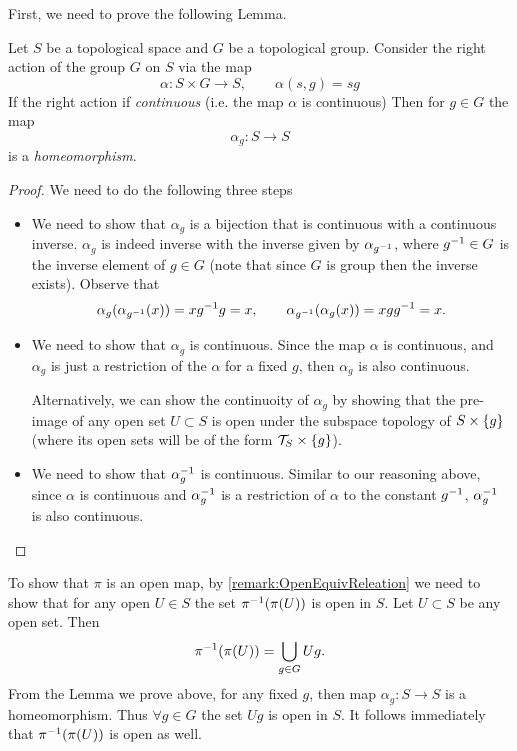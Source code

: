 \begin{solution}
	First, we need to prove the following Lemma.
	\begin{lemma}
		Let $ S $ be a topological space and $ G $ be a topological group. Consider the right action of the group $ G $ on $ S $ via the map 
		\[ \alpha : S \times G \to S, \qquad \alpha(s,g) = sg \]
		If the right action if \emph{continuous} (i.e. the map $ \alpha $ is continuous) Then for $ g \in G $ the map
		\[ \alpha_g: S \to S \]
		is a \emph{homeomorphism}.
	\end{lemma}
	\begin{proof}
		We need to do the following three steps
		\begin{itemize}
			\item We need to show that $ \alpha_g $ is a bijection that is continuous with a continuous inverse. $ \alpha_g $ is indeed inverse with the inverse given by $ \alpha_{g^{-1}} $, where $ g^{-1} \in G$ is the inverse element of $ g \in G $ (note that since $ G $ is group then the inverse exists). Observe that 
			\[ \alpha_g(\alpha_{g^{-1}}(x)) = xg^{-1}g = x, \qquad \alpha_{g^{-1}}(\alpha_g(x)) = xgg^{-1} = x. \]
			
			\item We need to show that $ \alpha_g $ is continuous. Since the map  $ \alpha $ is continuous, and $ \alpha_g $ is just a restriction of the $ \alpha $ for a fixed $ g $, then $ \alpha_g $ is also continuous. 
			
			Alternatively, we can show the continuoity of $ \alpha_g $ by showing that the pre-image of any open set $ U \subset S $ is open under the subspace topology of $ S \times \{g\}$ (where its open sets will be of the form $ \mathcal{T}_S\times\{g\} $).
			
			\item We need to show that $ \alpha_g^{-1} $ is continuous. Similar to our reasoning above, since $ \alpha $ is continuous and $ \alpha_g^{-1} $ is a restriction of $ \alpha $ to the constant $ g^{-1} $, $ \alpha_g^{-1} $ is also continuous.
		\end{itemize}	
	\end{proof}
	To show that $ \pi $ is an open map, by \autoref{remark:OpenEquivReleation} we need to show that for any open $ U \in S $ the set $ \pi^{-1}(\pi(U)) $ is open in $ S $. Let $ U \subset S $ be any open set. Then 
	\[ \pi^{-1}(\pi(U)) = \bigcup_{g \in G} Ug. \]
	From the Lemma we prove above, for any fixed $ g $, then map $ \alpha_g: S\to S $ is a homeomorphism. Thus $ \forall g\in G $ the set $ Ug $ is open in $ S $. It follows immediately that $ \pi^{-1}(\pi(U)) $ is open as well.
 \end{solution}